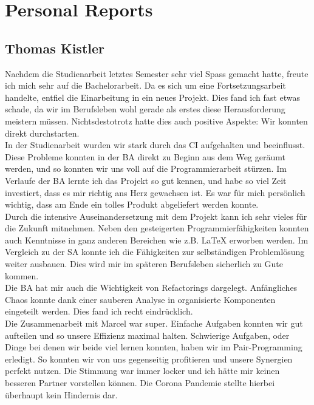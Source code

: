 \section*{Personal Reports}

\subsection*{Thomas Kistler}
Nachdem die Studienarbeit letztes Semester sehr viel Spass gemacht hatte, freute ich mich sehr auf die Bachelorarbeit.
Da es sich um eine Fortsetzungsarbeit handelte, entfiel die Einarbeitung in ein neues Projekt.
Dies fand ich fast etwas schade, da wir im Berufsleben wohl gerade als erstes diese Herausforderung meistern müssen.
Nichtsdestotrotz hatte dies auch positive Aspekte:
Wir konnten direkt durchstarten.\\

In der Studienarbeit wurden wir stark durch das CI aufgehalten und beeinflusst.
Diese Probleme konnten in der BA direkt zu Beginn aus dem Weg geräumt werden, und so konnten wir uns voll auf die Programmierarbeit stürzen.
Im Verlaufe der BA lernte ich das Projekt so gut kennen, und habe so viel Zeit investiert, dass es mir richtig ans Herz gewachsen ist.
Es war für mich persönlich wichtig, dass am Ende ein tolles Produkt abgeliefert werden konnte.\\

Durch die intensive Auseinandersetzung mit dem Projekt kann ich sehr vieles für die Zukunft mitnehmen.
Neben den gesteigerten Programmierfähigkeiten konnten auch Kenntnisse in ganz anderen Bereichen wie z.B. LaTeX erworben werden.
Im Vergleich zu der SA konnte ich die Fähigkeiten zur selbständigen Problemlösung weiter ausbauen.
Dies wird mir im späteren Berufsleben sicherlich zu Gute kommen.\\

Die BA hat mir auch die Wichtigkeit von Refactorings dargelegt.
Anfängliches Chaos konnte dank einer sauberen Analyse in organisierte Komponenten eingeteilt werden.
Dies fand ich recht eindrücklich.\\

Die Zusammenarbeit mit Marcel war super.
Einfache Aufgaben konnten wir gut aufteilen und so unsere Effizienz maximal halten.
Schwierige Aufgaben, oder Dinge bei denen wir beide viel lernen konnten, haben wir im Pair-Programming erledigt.
So konnten wir von uns gegenseitig profitieren und unsere Synergien perfekt nutzen.
Die Stimmung war immer locker und ich hätte mir keinen besseren Partner vorstellen können.
Die Corona Pandemie stellte hierbei überhaupt kein Hindernis dar.\\

